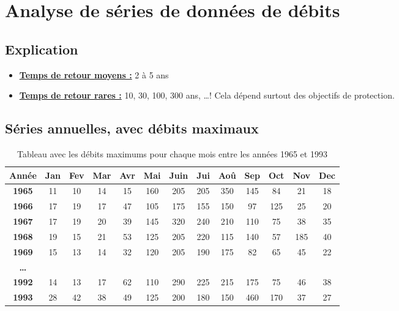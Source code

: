 \chapter{Analyse de séries de données de débits}

\section{Explication}
\begin{itemize}
    \item \underline{\textbf{Temps de retour moyens :}} 2 à 5 ans
    \item \underline{\textbf{Temps de retour rares :}} 10, 30, 100, 300 ans, \dots ! Cela dépend surtout des objectifs de protection.
\end{itemize}

\section{Séries annuelles, avec débits maximaux}


\begin{table}[H]
    \centering
    \begin{tabular}{|c||c|c|c|c|c|c|c|c|c|c|c|c|}
        \hline
        \textbf{Année} & \textbf{Jan} & \textbf{Fev} & \textbf{Mar} & \textbf{Avr} & \textbf{Mai} & \textbf{Juin} & \textbf{Jui} & \textbf{Aoû} & \textbf{Sep} & \textbf{Oct} & \textbf{Nov} & \textbf{Dec} \\
        \hline \hline
        \textbf{1965}  & 11 & \cellcolor{green}10 & 14 & 15 & 160 & 205 & 205 & \cellcolor{red}350 & 145 &  84 &  21 & 18 \\
        \hline
        \textbf{1966}  & \cellcolor{green}17 & 19 & 17 & 47 & 105 & \cellcolor{red}175 & 155 & 150 &  97 & 125 &  25 & 20 \\
        \hline
        \textbf{1967}  & \cellcolor{green}17 & 19 & 20 & 39 & 145 & \cellcolor{red}320 & 240 & 210 & 110 &  75 &  38 & 35 \\
        \hline
        \textbf{1968}  & 19 & \cellcolor{green}15 & 21 & 53 & 125 & 205 & \cellcolor{red}220 & 115 & 140 &  57 & 185 & 40 \\
        \hline
        \textbf{1969}  & 15 & \cellcolor{green}13 & 14 & 32 & 120 & \cellcolor{red}205 & 190 & 175 &  82 &  65 &  45 & 22 \\
        \hline
        \textbf{\dots} &    &    &    &    &     &     &     &     &       &     &     &      \\
        \hline
        \textbf{1992}  & 14 & \cellcolor{green}13 & 17 & 62 & 110 & \cellcolor{red}290 & 225 & 215 & 175 &  75 &  46 & 38 \\
        \hline
        \textbf{1993}  & 28 & 42 & 38 & 49 & 125 & 200 & 180 & 150 & \cellcolor{red}460 & 170 &  37 & \cellcolor{green}27 \\
        \hline
    \end{tabular}
    \caption{Tableau avec les débits maximums pour chaque mois entre les années 1965 et 1993}
    \label{tab:serieAnnuelleMaximum}
\end{table}

